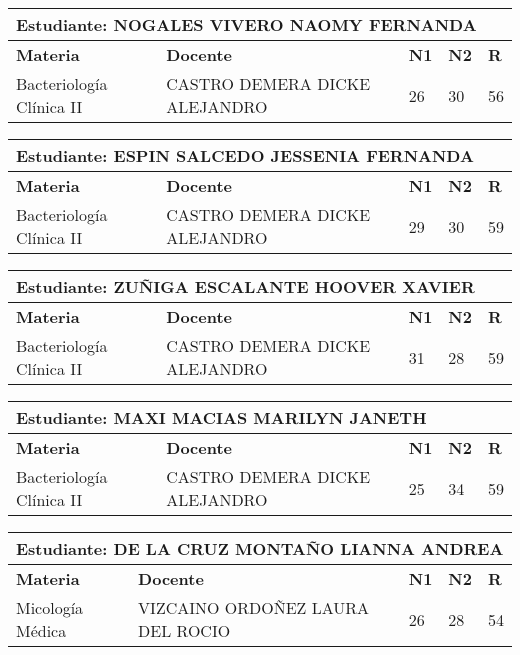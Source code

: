 \small
\begin{tabularx}{\textwidth}{|p{5cm}|p{7cm}|X|X|X|}
\hline
\multicolumn{5}{|p{\dimexpr\textwidth-2\tabcolsep-2\arrayrulewidth}|}{\textbf{Estudiante: NOGALES VIVERO NAOMY FERNANDA }}\\\hline
\textbf{Materia} & \textbf{Docente} & \textbf{N1} & \textbf{N2} & \textbf{R} \\ \hline
Bacteriología Clínica II & CASTRO DEMERA DICKE ALEJANDRO  & 26 & 30& 56 \\ \hline
\end{tabularx}\vspace{10mm}
\small
\begin{tabularx}{\textwidth}{|p{5cm}|p{7cm}|X|X|X|}
\hline
\multicolumn{5}{|p{\dimexpr\textwidth-2\tabcolsep-2\arrayrulewidth}|}{\textbf{Estudiante: ESPIN SALCEDO JESSENIA FERNANDA }}\\\hline
\textbf{Materia} & \textbf{Docente} & \textbf{N1} & \textbf{N2} & \textbf{R} \\ \hline
Bacteriología Clínica II & CASTRO DEMERA DICKE ALEJANDRO  & 29 & 30& 59 \\ \hline
\end{tabularx}\vspace{10mm}
\small
\begin{tabularx}{\textwidth}{|p{5cm}|p{7cm}|X|X|X|}
\hline
\multicolumn{5}{|p{\dimexpr\textwidth-2\tabcolsep-2\arrayrulewidth}|}{\textbf{Estudiante: ZUÑIGA ESCALANTE HOOVER XAVIER }}\\\hline
\textbf{Materia} & \textbf{Docente} & \textbf{N1} & \textbf{N2} & \textbf{R} \\ \hline
Bacteriología Clínica II & CASTRO DEMERA DICKE ALEJANDRO  & 31 & 28& 59 \\ \hline
\end{tabularx}\vspace{10mm}
\small
\begin{tabularx}{\textwidth}{|p{5cm}|p{7cm}|X|X|X|}
\hline
\multicolumn{5}{|p{\dimexpr\textwidth-2\tabcolsep-2\arrayrulewidth}|}{\textbf{Estudiante: MAXI MACIAS MARILYN JANETH }}\\\hline
\textbf{Materia} & \textbf{Docente} & \textbf{N1} & \textbf{N2} & \textbf{R} \\ \hline
Bacteriología Clínica II & CASTRO DEMERA DICKE ALEJANDRO  & 25 & 34& 59 \\ \hline
\end{tabularx}\vspace{10mm}
\small
\begin{tabularx}{\textwidth}{|p{5cm}|p{7cm}|X|X|X|}
\hline
\multicolumn{5}{|p{\dimexpr\textwidth-2\tabcolsep-2\arrayrulewidth}|}{\textbf{Estudiante: DE LA CRUZ MONTAÑO LIANNA ANDREA }}\\\hline
\textbf{Materia} & \textbf{Docente} & \textbf{N1} & \textbf{N2} & \textbf{R} \\ \hline
Micología Médica & VIZCAINO ORDOÑEZ LAURA DEL ROCIO   & 26 & 28& 54 \\ \hline
\end{tabularx}\vspace{10mm}
